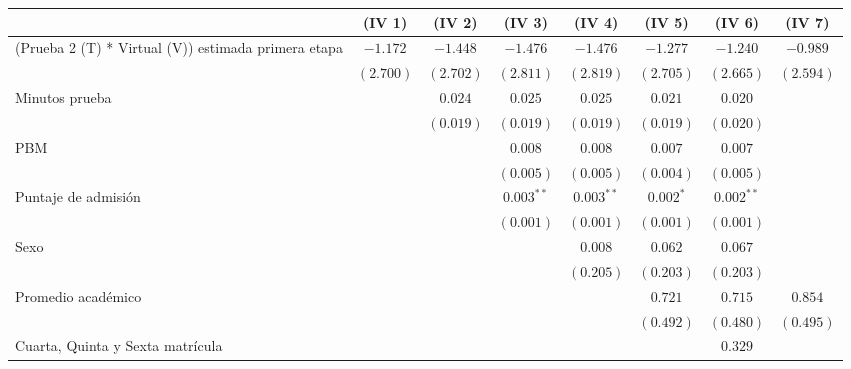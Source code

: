 
\begin{table}
\begin{center}
\begin{tabular}{l c c c c c c c}
\hline
 & (IV 1) & (IV 2) & (IV 3) & (IV 4) & (IV 5) & (IV 6) & (IV 7) \\
\hline
(Prueba 2 (T) * Virtual (V)) estimada primera etapa & $-1.172$  & $-1.448$  & $-1.476$     & $-1.476$     & $-1.277$    & $-1.240$     & $-0.989$  \\
                                                    & $(2.700)$ & $(2.702)$ & $(2.811)$    & $(2.819)$    & $(2.705)$   & $(2.665)$    & $(2.594)$ \\
Minutos prueba                                      &           & $0.024$   & $0.025$      & $0.025$      & $0.021$     & $0.020$      &           \\
                                                    &           & $(0.019)$ & $(0.019)$    & $(0.019)$    & $(0.019)$   & $(0.020)$    &           \\
PBM                                                 &           &           & $0.008$      & $0.008$      & $0.007$     & $0.007$      &           \\
                                                    &           &           & $(0.005)$    & $(0.005)$    & $(0.004)$   & $(0.005)$    &           \\
Puntaje de admisión                                 &           &           & $0.003^{**}$ & $0.003^{**}$ & $0.002^{*}$ & $0.002^{**}$ &           \\
                                                    &           &           & $(0.001)$    & $(0.001)$    & $(0.001)$   & $(0.001)$    &           \\
Sexo                                                &           &           &              & $0.008$      & $0.062$     & $0.067$      &           \\
                                                    &           &           &              & $(0.205)$    & $(0.203)$   & $(0.203)$    &           \\
Promedio académico                                  &           &           &              &              & $0.721$     & $0.715$      & $0.854$   \\
                                                    &           &           &              &              & $(0.492)$   & $(0.480)$    & $(0.495)$ \\
Cuarta, Quinta y Sexta matrícula                    &           &           &              &              &             & $0.329$      &           \\

\end{tabular}
\end{center}
\end{table}
